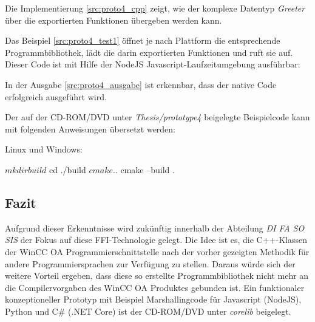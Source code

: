 

Die Implementierung \ref{src:proto4_cpp} zeigt, wie der komplexe Datentyp \textit{Greeter} über die exportierten Funktionen übergeben werden kann.



Das Beispiel \ref{src:proto4_test1} öffnet je nach Plattform die entsprechende Programmbibliothek, lädt die darin exportierten Funktionen
und ruft sie auf. Dieser Code ist mit Hilfe der NodeJS Javascript-Laufzeitumgebung ausführbar:



In der Ausgabe \ref{src:proto4_ausgabe} ist erkennbar, dass der native Code erfolgreich ausgeführt wird.
\\
\par
Der auf der CD-ROM/DVD unter \textit{Thesis/prototype4} beigelegte Beispielcode kann mit folgenden Anweisungen übersetzt werden:
\\
\par
Linux und Windows:

\begin{GenericCode}
$ mkdir build
$ cd ./build
$ cmake ..
$ cmake --build .
\end{GenericCode}

\subsection{Fazit}

Aufgrund dieser Erkenntnisse wird zukünftig innerhalb der Abteilung \textit{DI FA SO SIS} der Fokus auf diese FFI-Technologie gelegt. Die
Idee ist es, die C++-Klassen der WinCC OA Programmierschnittstelle nach der vorher gezeigten Methodik für andere Programmiersprachen zur 
Verfügung zu stellen. Daraus würde sich der weitere Vorteil ergeben, dass diese so erstellte Programmbibliothek nicht mehr an die 
Compilervorgaben des WinCC OA Produktes gebunden ist.
Ein funktionaler konzeptioneller Prototyp mit Beispiel Marshallingcode für Javascript (NodeJS), Python und C\# (.NET Core) ist der CD-ROM/DVD unter 
\textit{corelib} beigelegt.